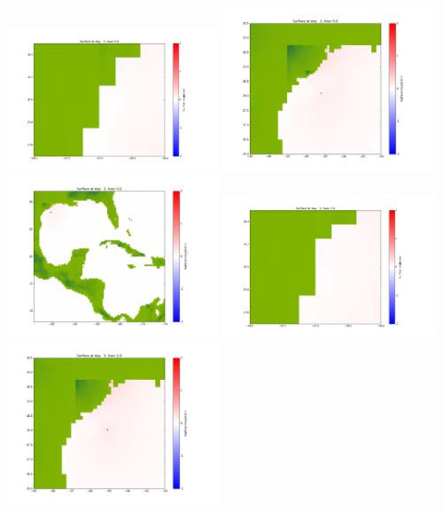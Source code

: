 \documentclass[11pt]{article}
\begin{document}
\vskip 10pt 
\includegraphics[width=0.475\textwidth]{frame0060fig1001.png}
\includegraphics[width=0.475\textwidth]{frame0060fig1002.png}
\vskip 10pt 
\includegraphics[width=0.475\textwidth]{frame0060fig1003.png}
\vskip 10pt 
\includegraphics[width=0.475\textwidth]{frame0061fig1001.png}
\includegraphics[width=0.475\textwidth]{frame0061fig1002.png}
\end{document}
